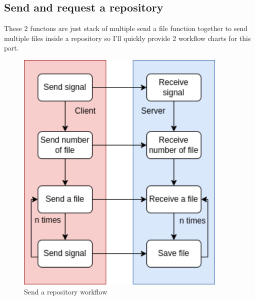 \documentclass{article}
\begin{document}
\subsection*{Send and request a repository}
These 2 functons are just stack of multiple send a file function together to send multiple files inside a repository so I'll quickly provide 2 workflow charts
for this part.

\begin{figure}[H]
  \centering
  \begin{minipage}{0.45\textwidth}
      \centering
      \includegraphics[width=0.9\textwidth]{SEND_A_REPO.drawio.png} %
      \caption{Send a repository workflow}
  \end{minipage}\hfill
  \begin{minipage}{0.45\textwidth}
      \centering

\end{minipage}
\end{figure}
\end{document}
